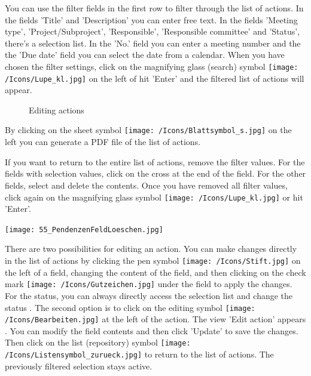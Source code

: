 You can use the filter fields in the first row to filter through the list of actions. In the fields 'Title' and 'Description' you can enter free text. In the fields 'Meeting type', 'Project/Subproject', 'Responsible', 'Responsible committee' and 'Status', there's a selection list. In the 'No.' field you can enter a meeting number and the the 'Due date' field you can select the date from a calendar. When you have chosen the filter settings, click on the magnifying glass (search) symbol \texttt{[image: /Icons/Lupe\_kl.jpg]}  on the left of hit 'Enter' and the filtered list of actions will appear.

\begin{figure}[H]
\caption{Editing actions}
\end{figure}

By clicking on the sheet symbol \texttt{[image: /Icons/Blattsymbol\_s.jpg]}  on the left you can generate a PDF file of the list of actions.

\vspace{\baselineskip}

If you want to return to the entire list of actions, remove the filter values. For the fields with selection values, click on the cross  at the end of the field. For the other fields, select and delete the contents. Once you have removed all filter values, click again on the magnifying glass symbol \texttt{[image: /Icons/Lupe\_kl.jpg]}  or hit 'Enter'.

\begin{center}
\texttt{[image: 55\_PendenzenFeldLoeschen.jpg]}
\end{center}

There are two possibilities for editing an action. You can make changes directly in the list of actions by clicking the pen symbol \texttt{[image: /Icons/Stift.jpg]}  on the left of a field, changing the content of the field, and then clicking on the check mark \texttt{[image: /Icons/Gutzeichen.jpg]}  under the field to apply the changes. For the status, you can always directly access the selection list and change the status . The second option is to click on the editing symbol \texttt{[image: /Icons/Bearbeiten.jpg]}  at the left of the action. The view 'Edit action' appears . You can modify the field contents and then click 'Update' to save the changes. Then click on the list (repository) symbol \texttt{[image: /Icons/Listensymbol\_zurueck.jpg]}  to return to the list of actions. The previously filtered selection stays active.


